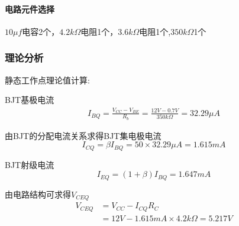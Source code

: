 \documentclass[10pt, conference, compsocconf, a4paper]{IEEEtran}
\begin{document}

\paragraph{电路元件选择}\noindent

$10\mu f$电容2个，$4.2k\Omega$电阻1个，$3.6k\Omega$电阻1个,$350k\Omega$1个
\subsubsection{理论分析} %
静态工作点理论值计算:\cite{elecTextBook}

BJT基极电流
\begin{equation}
  \begin{split}
    I_{BQ}=\frac{V_{CC}-V_{BE}}{R_b}=\frac{12V-0.7V}{350k\Omega}=32.29\mu A
  \end{split}
\end{equation}

由BJT的分配电流关系求得BJT集电极电流
\begin{equation}
  I_{CQ}=\beta I_{BQ}=50\times32.29\mu A=1.615mA
\end{equation}

BJT射级电流
\begin{equation}
  I_{EQ}=(1+\beta)I_{BQ}=1.647mA
\end{equation}

由电路结构可求得$V_{CEQ}$
\begin{equation}
  \begin{split}
    V_{CEQ}&=V_{CC}-I_{CQ}R_C\\
    &=12V-1.615mA\times 4.2k\Omega=5.217V
  \end{split}
\end{equation}
\end{document}
